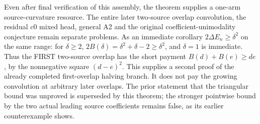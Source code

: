 Even after final verification of this assembly, the theorem supplies
a one-arm source-curvature resource. The entire later two-source
overlap convolution, the residual c0 mixed head, general A2 and the
original coefficient-unimodality conjecture remain separate problems.
As an immediate corollary $2\Delta E_n\ge\delta^2$ on the same range:
for $\delta\ge2$, $2B(\delta)=\delta^2+\delta-2\ge\delta^2$,
and $\delta=1$ is immediate. Thus the FIRST two-source overlap has
the short payment $B(d)+B(e)\ge de$, by the nonnegative square
$(d-e)^2$. This supplies a second proof of the already completed
first-overlap halving branch. It does not pay the growing convolution
at arbitrary later overlaps.
The prior statement that the triangular bound was unproved is superseded
by this theorem; the stronger pointwise bound by the two actual leading
source coefficients remains false, as its earlier counterexample shows.
